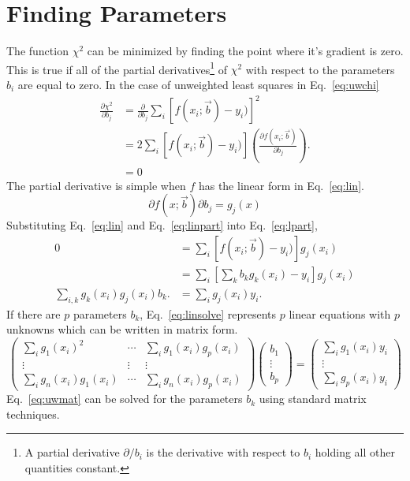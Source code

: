 \documentclass{scrartcl}
\begin{document}
\section{Finding Parameters}
The function $\chi^2$ can be minimized by finding the point
where it's gradient is zero.
This is true if all of the partial derivatives\footnote{A
partial derivative $\partial/b_i$ is the derivative with respect
to $b_i$ holding all other quantities constant.}
of $\chi^2$ with
respect to the parameters $b_i$ are equal to zero. In the case 
of unweighted least squares in Eq.~\ref{eq:uwchi}
\begin{align}
\frac{\partial \chi^2}{\partial b_j} &= \frac{\partial}{\partial b_j}
\sum_i [f(x_i;\vec{b})-y_i)]^2\\
	&= 2\sum_i [f(x_i;\vec{b})-y_i)]
		\left(\frac{\partial f(x_i;\vec{b})}{\partial b_j}\right).
		\label{eq:lpart}\\
	&= 0
\end{align}
The partial derivative is simple when $f$ has the linear form
in Eq.~\ref{eq:lin}.
\begin{equation}
\partial{f(x;\vec{b})}{\partial b_j} = g_j(x)\label{eq:linpart}
\end{equation}
Substituting Eq.~\ref{eq:lin} and Eq.~\ref{eq:linpart} into
Eq.~\ref{eq:lpart},
\begin{align}
0 &= \sum_i [f(x_i;\vec{b})-y_i)]g_j(x_i)\\
	&= \sum_i \left[\sum_k b_k g_k(x_i)-y_i\right]g_j(x_i)\\
	\sum_{i,k} g_k(x_i)g_j(x_i)b_k.&= \sum_i g_j(x_i)y_i.\label{eq:linsolve}
\end{align}
If there are $p$ parameters $b_k$, Eq.~\ref{eq:linsolve} represents
$p$ linear equations with $p$ unknowns which can be written in
matrix form.
\begin{equation}
\left(\begin{array}{ccc}
\sum_i g_1(x_i)^2&\cdots&\sum_i g_1(x_i)g_p(x_i)\\
\vdots&\vdots&\vdots\\
\sum_i g_n(x_i)g_1(x_i)&\cdots&\sum_i g_n(x_i)g_p(x_i)
\end{array}\right)
\left(\begin{array}{c}
b_1\\
\vdots\\
b_p
\end{array}\right) =
\left(\begin{array}{c}
\sum_i g_1(x_i)y_i\\
\vdots\\
\sum_i g_p(x_i)y_i
\end{array}\right)\label{eq:uwmat}
\end{equation}
Eq.~\ref{eq:uwmat} can be solved for the parameters $b_k$
using standard matrix techniques.
\end{document}
